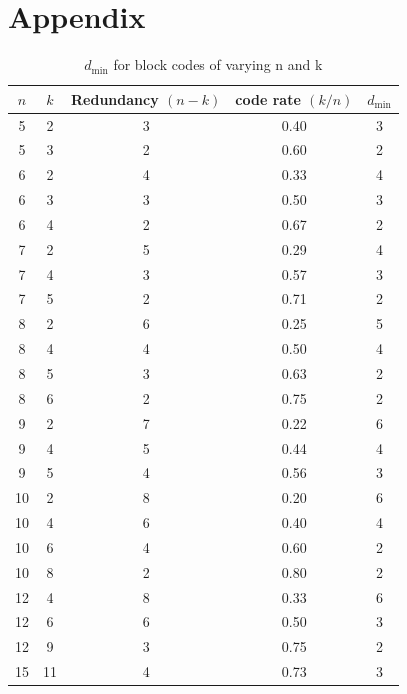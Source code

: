 \documentclass{article}
\begin{document}
\section{Appendix}
\begin{table}[ht]
  \centering
  \begin{tabular}{ccccc}
    \hline
    \(n\)  &  \(k\)  &  Redundancy \((n - k)\)  & code rate \((k/n)\) & \(d_\text{min}\)\\
    \hline
         5  &   2  &  3  &  0.40  &  3 \\
         5  &   3  &  2  &  0.60  &  2 \\
         6  &   2  &  4  &  0.33  &  4 \\
         6  &   3  &  3  &  0.50  &  3 \\
         6  &   4  &  2  &  0.67  &  2 \\
         7  &   2  &  5  &  0.29  &  4 \\
         7  &   4  &  3  &  0.57  &  3 \\
         7  &   5  &  2  &  0.71  &  2 \\
         8  &   2  &  6  &  0.25  &  5 \\
         8  &   4  &  4  &  0.50  &  4 \\
         8  &   5  &  3  &  0.63  &  2 \\
         8  &   6  &  2  &  0.75  &  2 \\
         9  &   2  &  7  &  0.22  &  6 \\
         9  &   4  &  5  &  0.44  &  4 \\
         9  &   5  &  4  &  0.56  &  3 \\
        10  &   2  &  8  &  0.20  &  6 \\
        10  &   4  &  6  &  0.40  &  4 \\
        10  &   6  &  4  &  0.60  &  2 \\
        10  &   8  &  2  &  0.80  &  2 \\
        12  &   4  &  8  &  0.33  &  6 \\
        12  &   6  &  6  &  0.50  &  3 \\
        12  &   9  &  3  &  0.75  &  2 \\
        15  &  11  &  4  &  0.73  &  3 \\
    \hline
  \end{tabular}
  \caption{\(d_\text{min}\) for block codes of varying n and k \parencite{jaish2026}}
  \label{tab:empirical_investigation}
\end{table}
\end{document}
